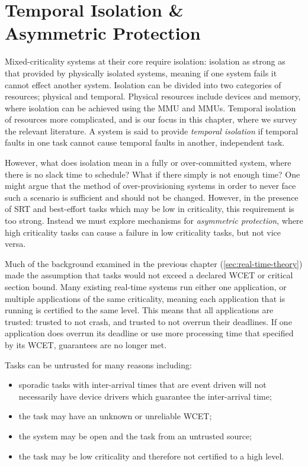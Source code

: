 \chapter{Temporal Isolation \& \\ Asymmetric Protection}
\label{chap:scheduling}

Mixed-criticality systems at their core require isolation: isolation as strong as that provided by
physically isolated systems, meaning if one system fails it cannot effect another system.  Isolation
can be divided into two categories of resources; physical and temporal. Physical resources include 
devices and memory, where isolation can be achieved using the \gls{MMU} and \IO\glspl{MMU}.
Temporal isolation of resources more complicated, and is our focus in this chapter, where
we survey the relevant literature.
A system is said to provide \emph{temporal isolation} if temporal faults in one task cannot cause
temporal faults in another, independent task. 

However, what does isolation mean in a fully or over-committed system, where there is no slack time 
to schedule? What if there simply is not enough time? One might argue that the method of
over-provisioning systems in order to never face such a scenario is sufficient and should not be
changed. However, in the presence of \gls{SRT} and best-effort tasks which may be low in
criticality, this requirement is too strong. Instead we must explore mechanisms for \emph{asymmetric
protection}, where high criticality tasks can cause a failure in low criticality tasks, but not vice
versa.

Much of the background examined in the previous chapter (\cref{sec:real-time-theory})
made the assumption that tasks would not exceed a declared \gls{WCET} or critical section bound. 
Many existing real-time systems run either one application, or multiple applications of the same
criticality, meaning each application that is running is certified to the same level.  This means
that all applications are trusted: trusted to not crash, and trusted to not overrun their deadlines.
If one application does overrun its deadline or use more processing time that specified by its
\gls{WCET}, guarantees are no longer met. 

Tasks can be untrusted for many reasons including:
\begin{itemize}
    \item sporadic tasks with inter-arrival times that are event driven will not necessarily
      have device drivers which guarantee the inter-arrival time;
    \item the task may have an unknown or unreliable \gls{WCET};
    \item the system may be open and the task from an untrusted source;
    \item the task may be low criticality and therefore not certified to a high level.
\end{itemize}

